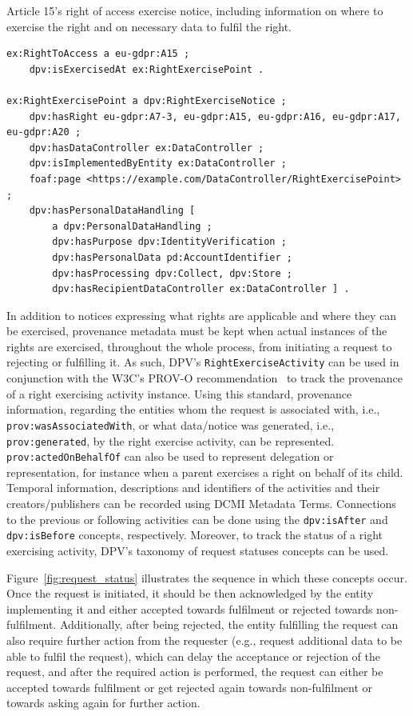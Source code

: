 \begin{listing}[htp]
\caption{Article 15's right of access exercise notice, including information on where to exercise the right and on necessary data to fulfil the right.}
\label{list:exercise_point}
\begin{verbatim}
ex:RightToAccess a eu-gdpr:A15 ;
    dpv:isExercisedAt ex:RightExercisePoint .

ex:RightExercisePoint a dpv:RightExerciseNotice ;
    dpv:hasRight eu-gdpr:A7-3, eu-gdpr:A15, eu-gdpr:A16, eu-gdpr:A17, eu-gdpr:A20 ;
    dpv:hasDataController ex:DataController ;
    dpv:isImplementedByEntity ex:DataController ;
    foaf:page <https://example.com/DataController/RightExercisePoint> ;
    dpv:hasPersonalDataHandling [ 
        a dpv:PersonalDataHandling ;
        dpv:hasPurpose dpv:IdentityVerification ;
        dpv:hasPersonalData pd:AccountIdentifier ;
        dpv:hasProcessing dpv:Collect, dpv:Store ;
        dpv:hasRecipientDataController ex:DataController ] .
\end{verbatim}
\end{listing}

In addition to notices expressing what rights are applicable and where they can be exercised, provenance metadata must be kept when actual instances of the rights are exercised, throughout the whole process, from initiating a request to rejecting or fulfilling it.
As such, DPV's \texttt{RightExerciseActivity} can be used in conjunction with the W3C's PROV-O recommendation~\citep{lebo_prov-o_2013} to track the provenance of a right exercising activity instance.
Using this standard, provenance information, regarding the entities whom the request is associated with, i.e., \texttt{prov:wasAssociatedWith}, or what data/notice was generated, i.e., \texttt{prov:generated}, by the right exercise activity, can be represented.
\texttt{prov:actedOnBehalfOf} can also be used to represent delegation or representation, for instance when a parent exercises a right on behalf of its child.
Temporal information, descriptions and identifiers of the activities and their creators/publishers can be recorded using DCMI Metadata Terms.
Connections to the previous or following activities can be done using the \texttt{dpv:isAfter} and \texttt{dpv:isBefore} concepts, respectively.
Moreover, to track the status of a right exercising activity, DPV's taxonomy of request statuses concepts can be used.

Figure~\ref{fig:request_status} illustrates the sequence in which these concepts occur.
Once the request is initiated, it should be then acknowledged by the entity implementing it and either accepted towards fulfilment or rejected towards non-fulfilment.
Additionally, after being rejected, the entity fulfilling the request can also require further action from the requester (e.g., request additional data to be able to fulfil the request), which can delay the acceptance or rejection of the request, and after the required action is performed, the request can either be accepted towards fulfilment or get rejected again towards non-fulfilment or towards asking again for further action.

